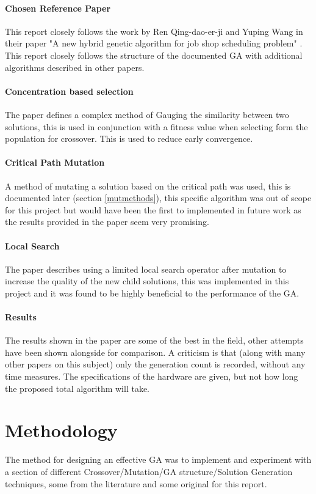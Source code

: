 \documentclass[14pt]{acmsiggraph}
\begin{document}
	\paragraph{Chosen Reference Paper}
	This report closely follows the work by Ren Qing-dao-er-ji and Yuping Wang in their paper "A new hybrid genetic algorithm for job shop scheduling problem" \cite{wang2012new}. This report closely follows the structure of the documented GA with additional algorithms described in other papers.
	
	\paragraph{Concentration based selection}
	The paper defines a complex method of Gauging the similarity between two solutions, this is used in conjunction with a fitness value when selecting form the population for crossover. This is used to reduce early convergence. 
	
	\paragraph{Critical Path Mutation}
	A method of mutating a solution based on the critical path was used, this is documented later (section \ref{mutmethods}), this specific algorithm was out of scope for this project but would have been the first to implemented in future work as the results provided in the paper seem very promising.
	
	\paragraph{Local Search}
	The paper describes using a limited local search operator after mutation to increase the quality of the new child solutions, this was implemented in this project and it was found to be highly beneficial to the performance of the GA.
	
	\paragraph{Results}
	The results shown in the paper are some of the best in the field, other attempts have been shown alongside for  comparison.
	A criticism is that (along with many other papers on this subject) only the generation count is recorded, without any time measures. The specifications of the hardware are given, but not how long the proposed total algorithm will take.
	
	\section{Methodology}
	The method for designing an effective GA was to implement and experiment with a section of different Crossover/Mutation/GA structure/Solution Generation techniques, some from the literature and some original for this report.
	
\end{document}
